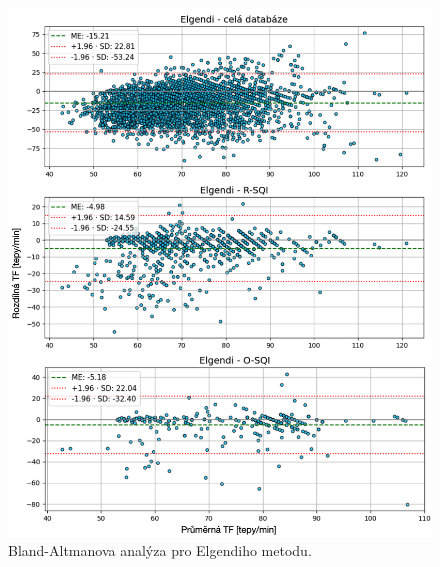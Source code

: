 \begin{figure}[!ht]
	\centering
	\includegraphics[width=1\textwidth]{./obrazky/vysledky/BA_BUT_Elgendi.png}
	\caption[Bland-Altmanova analýza pro Elgendiho metodu - BUT PPG]{Bland-Altmanova analýza pro Elgendiho metodu.}
	\label{fig:BUT_BlandAltman_elgendi}
\end{figure}


